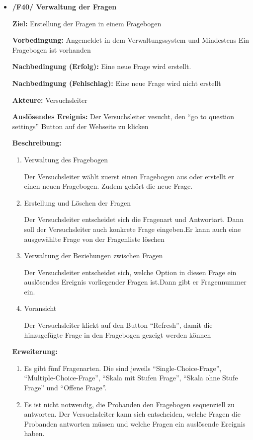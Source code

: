 \documentclass[a4paper]{scrreprt}
\begin{document}
\begin{itemize}
                \item \textbf{/F40/ Verwaltung der Fragen }
                \par \textbf{Ziel: }Erstellung der Fragen in einem Fragebogen
                \par \textbf{Vorbedingung: } Angemeldet in dem Verwaltungssystem und Mindestens Ein Fragebogen ist vorhanden
                \par \textbf{Nachbedingung (Erfolg): }Eine neue Frage wird erstellt.
                \par \textbf{Nachbedingung (Fehlschlag): }Eine neue Frage wird nicht erstellt
                \par \textbf{Akteure: }\gls{Versuchsleiter}
                \par \textbf{Auslösendes Ereignis: }Der \gls{Versuchsleiter} vesucht, den ``go to question settings'' Button auf der Webseite zu klicken
                \par \textbf{Beschreibung: }
                \begin{enumerate}
                    \item Verwaltung des Fragebogen
                    \par Der \gls{Versuchsleiter} wählt zuerst einen Fragebogen aus oder erstellt er einen neuen Fragebogen. Zudem gehört die neue Frage.
                    \item Erstellung und Löschen der Fragen
                    \par Der \gls{Versuchsleiter} entscheidet sich die Fragenart und Antwortart. Dann soll der \gls{Versuchsleiter} auch konkrete Frage eingeben.Er kann auch eine ausgewählte Frage von der Fragenliste löschen
                    \item Verwaltung der Beziehungen zwischen Fragen
                    \par Der \gls{Versuchsleiter} entscheidet sich, welche Option in diesen Frage ein auslösendes Ereignis vorliegender Fragen ist.Dann gibt er Fragennummer ein.
                    \item Voransicht
                    \par Der \gls{Versuchsleiter} klickt auf den Button ``Refresh'', damit die hinzugefügte Frage in den Fragebogen gezeigt werden können
                \end{enumerate}
                \par \textbf{Erweiterung: }
                \begin{enumerate}
                    \item Es gibt fünf Fragenarten. Die sind jeweils ``Single-Choice-Frage'', ``Multiple-Choice-Frage'', ``Skala mit Stufen Frage'', ``Skala ohne Stufe Frage'' und ``Offene Frage''.
                    \item Es ist nicht notwendig, die \gls{Proband}en den Fragebogen sequenziell zu antworten. Der \gls{Versuchsleiter} kann sich entscheiden, welche Fragen die \gls{Proband}en antworten müssen und welche Fragen ein auslösende Ereignis haben.
                \end{enumerate}



\end{itemize}
\end{document}
